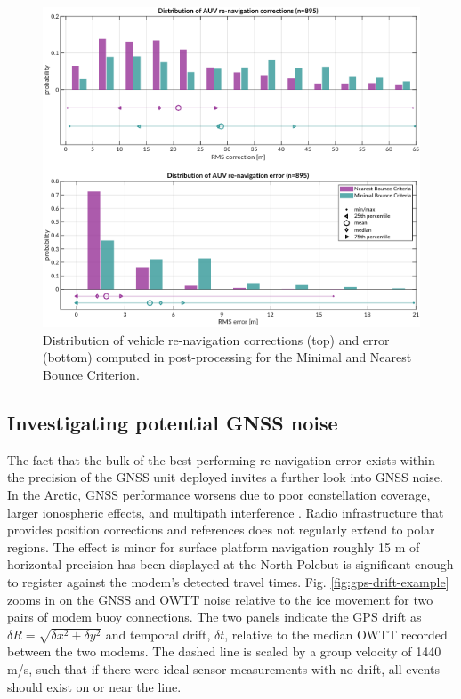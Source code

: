 \begin{figure}[!ht]
\includegraphics[width=\textwidth]{figs/auv-trilat-stat.pdf}
\caption{Distribution of vehicle re-navigation corrections (top) and error (bottom) computed in post-processing for the Minimal and Nearest Bounce Criterion.}
\label{fig:trilat-auv}
\end{figure}

\subsection{Investigating potential GNSS noise}

The fact that the bulk of the best performing re-navigation error exists within the precision of the GNSS unit deployed invites a further look into GNSS noise.
In the Arctic, GNSS performance worsens due to poor constellation coverage, larger ionospheric effects, and multipath interference \citep{NAP12914,swanlund_gps_2016,Themens2015,Gwal2011,Jung2018,Reid2016}.
Radio infrastructure that provides position corrections and references does not regularly extend to polar regions.
The effect is minor for surface platform navigation \textemdash roughly 15 m of horizontal precision has been displayed at the North Pole\textemdash but is significant enough to register against the modem's detected travel times.
Fig. \ref{fig:gps-drift-example} zooms in on the GNSS and OWTT noise relative to the ice movement for two pairs of modem buoy connections.
The two panels indicate the GPS drift as $\delta R = \sqrt{\delta x^2 + \delta y^2}$ and temporal drift, $\delta t$, relative to the median OWTT recorded between the two modems.
The dashed line is scaled by a group velocity of 1440 m/s, such that if there were ideal sensor measurements with no drift, all events should exist on or near the line.

